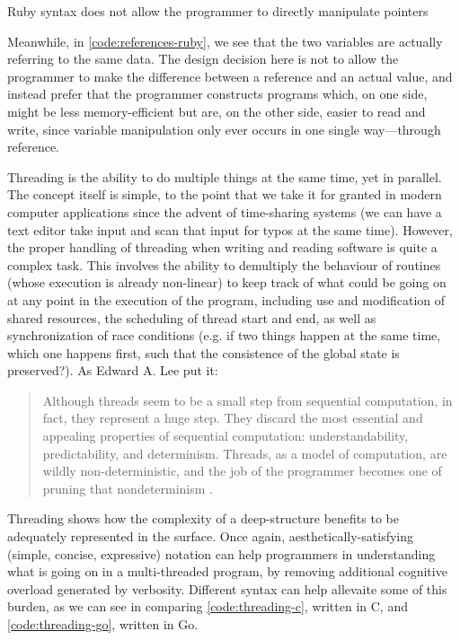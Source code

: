 \begin{listing}
  \inputminted{python}{./corpus/references.rb}
  \caption{Ruby syntax does not allow the programmer to directly manipulate pointers}
  \label{code:references-ruby}
\end{listing}

Meanwhile, in \ref{code:references-ruby}, we see that the two variables are actually referring to the same data. The design decision here is not to allow the programmer to make the difference between a reference and an actual value, and instead prefer that the programmer constructs programs which, on one side, might be less memory-efficient but are, on the other side, easier to read and write, since variable manipulation only ever occurs in one single way—through reference.

Threading is the ability to do multiple things at the same time, yet in parallel. The concept itself is simple, to the point that we take it for granted in modern computer applications since the advent of time-sharing systems (we can have a text editor take input and scan that input for typos at the same time). However, the proper handling of threading when writing and reading software is quite a complex task. This involves the ability to demultiply the behaviour of routines (whose execution is already non-linear) to keep track of what could be going on at any point in the execution of the program, including use and modification of shared resources, the scheduling of thread start and end, as well as synchronization of race conditions (e.g. if two things happen at the same time, which one happens first, such that the consistence of the global state is preserved?). As Edward A. Lee put it:

\begin{quote}
  Although threads seem to be a small step from sequential computation, in fact, they represent a huge step. They discard the most essential and appealing properties of sequential computation: understandability, predictability, and determinism. Threads, as a model of computation, are wildly non-deterministic, and the job of the programmer becomes one of pruning that nondeterminism \citep{lee_problem_2006}.
\end{quote}

Threading shows how the complexity of a deep-structure benefits to be adequately represented in the surface. Once again, aesthetically-satisfying (simple, concise, expressive) notation can help programmers in understanding what is going on in a multi-threaded program, by removing additional cognitive overload generated by verbosity. Different syntax can help allevaite some of this burden, as we can see in comparing \ref{code:threading-c}, written in C, and \ref{code:threading-go}, written in Go.

